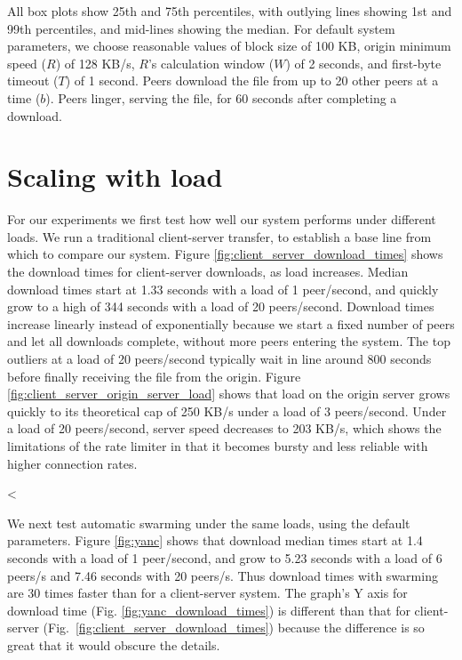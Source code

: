 All box plots show 25th and 75th percentiles, with outlying lines showing 1st and 99th percentiles, and mid-lines showing the median.
For default system parameters, we choose reasonable values of block size of 100 KB, origin minimum speed ($R$) of 128 KB/s, $R$'s calculation window ($W$) 
of 2 seconds, and first-byte timeout ($T$) of 1 second.  Peers download the file from up to 20 other peers at a time ($b$).
Peers linger, serving the file, for 60 seconds after completing a download.

\section{Scaling with load}

For our experiments we first test how well our system performs under different loads.
We run a traditional client-server transfer, to establish a base line from which to compare 
our system. Figure \ref{fig:client_server_download_times} shows the download times for client-server 
downloads, as load increases.  Median download times start at 1.33 seconds with a load of 1 peer/second,
and quickly grow to a high of 344 seconds with a load of 20 peers/second. Download times increase linearly instead 
of exponentially because we start a fixed number of peers and let all downloads complete, without more peers
entering the system.
The top outliers at a load of 20 peers/second typically wait in line around 800 seconds before 
finally receiving the file from the origin. Figure \ref{fig:client_server_origin_server_load} shows that load on the origin server grows quickly to its 
theoretical cap of 250 KB/s under a load of 3 peers/second. Under a load of 20 peers/second, server speed decreases to 203 KB/s, which 
shows the limitations of the rate limiter in that it becomes bursty and less reliable with higher connection rates.

<%

We next test automatic swarming under the same loads, using the default parameters. Figure \ref{fig:yanc} shows that download median times 
start at 1.4 seconds with a load of 1 peer/second, and grow 
to 5.23 seconds with a load of 6 peers/s and 7.46 seconds with 20 peers/s.  Thus download times with swarming are 
30 times faster than for a client-server system.   
The graph's Y axis for download time (Fig. \ref{fig:yanc_download_times}) 
is different than that for client-server (Fig.~\ref{fig:client_server_download_times}) 
because the difference is so great that it would obscure the details. 


